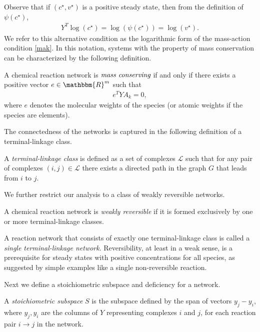 \documentclass[smallextended]{svjour3}       %
\newcounter{sent}
\newcommand*{\0}{\mathbf{0}}
\newcommand*{\1}{\mathbf{1}}
\newcommand*{\R}{\mathbbm{R}}
\begin{document}
Observe that if $(c^\star,v^\star)$ is a positive steady state, then from the
definition of $\psi(c^\star)$,
\begin{align}
  Y^T\log(c^\star)= \log(\psi(c^\star))= \log(v^\star).
  \label{mak-alt}
	\tag{MA-log}
\end{align} 
We refer to this alternative condition as the logarithmic form of the
mass-action condition \eqref{mak}.  In this notation, systems with the property
of mass conservation can be characterized by the following definition. 
\begin{defn}
	A chemical reaction network is $\emph{mass conserving}$ if and only if there
	exists a positive vector $e\in\R^m$ such that 
	\begin{align}
	 e^TYA_k=0,
	  \label{consis}
	\end{align}
	where $e$ denotes the molecular weights of the species (or atomic weights if
	the species are elements).  
\end{defn}

The connectedness of the networks is captured in the following definition of a
terminal-linkage class.  
\begin{defn} 
	A \emph{terminal-linkage class} is defined as a set of complexes
	$\mathcal{L}$ such that for any pair of complexes $(i,j) \in \mathcal{L}$
	there exists a directed path in the graph $G$ that leads from $i$ to $j$.  
\end{defn} 

We further restrict our analysis to a class of weakly reversible networks.
\begin{defn} 
	A chemical reaction network is \emph{weakly reversible} if it is formed
	exclusively by one or more terminal-linkage classes.
\end{defn} 

A reaction network that consists of exactly one terminal-linkage class is
called a \emph{single terminal-linkage network}. Reversibility, at least in a
weak sense, is a prerequisite for steady states with positive concentrations
for all species, as suggested by simple examples like a single non-reversible
reaction.

Next we define a stoichiometric subspace and deficiency for a network.
\begin{defn} 
	A \emph{stoichiometric subspace} $S$ is the subspace defined by the span of
	vectors $y_{j}-y_{i}$, where $y_{j}, y_{i}$ are the columns of $Y$
	representing complexes $i$ and $j$, for each reaction pair $i \rightarrow j$
	in the network. 
\end{defn} 
\end{document}
